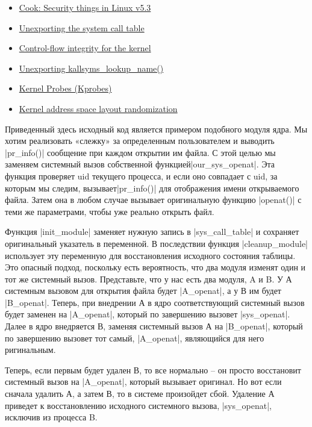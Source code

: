 \documentclass[10pt, oneside]{book}
\begin{document}
\begin{itemize}
 \item \href{https://lwn.net/Articles/804849/}{Cook: Security things in Linux v5.3}
 \item \href{https://lwn.net/Articles/12211/}{Unexporting the system call table}
 \item \href{https://lwn.net/Articles/810077/}{Control-flow integrity for the kernel}
 \item \href{https://lwn.net/Articles/813350/}{Unexporting kallsyms\_lookup\_name()}
 \item \href{https://www.kernel.org/doc/Documentation/kprobes.txt}{Kernel Probes (Kprobes)}
 \item \href{https://lwn.net/Articles/569635/}{Kernel address space layout randomization}
\end{itemize}

Приведенный здесь исходный код является примером подобного модуля ядра. Мы хотим
реализовать «слежку» за определенным пользователем и выводить \cpp|pr_info()| сообщение при каждом открытии им файла.
С этой целью мы заменяем системный вызов собственной функцией\cpp|our_sys_openat|.
 Эта функция проверяет uid текущего процесса, и если оно совпадает с uid, за которым мы следим, вызывает\cpp|pr_info()| для
отображения имени открываемого файла. Затем она в любом случае вызывает оригинальную функцию \cpp|openat()| с теми же параметрами, чтобы уже реально открыть файл.

Функция \cpp|init_module| заменяет нужную запись в \cpp|sys_call_table| и сохраняет оригинальный указатель в переменной.
В последствии функция \cpp|cleanup_module| использует эту переменную для восстановления исходного состояния таблицы. Это опасный подход, поскольку есть
вероятность, что два модуля изменят один и тот же системный вызов.
Представьте, что у нас есть два модуля, A и B. У А системным вызовом для открытия файла будет \cpp|A_openat|, а у В им будет \cpp|B_openat|.
Теперь, при внедрении А в ядро соответствующий системный вызов будет заменен на \cpp|A_openat|, который по завершению вызовет \cpp|sys_openat|. Далее в ядро внедряется В, заменяя системный вызов А на \cpp|B_openat|, который по завершению вызовет тот самый, \cpp|A_openat|, являющийся для него ригинальным.

Теперь, если первым будет удален В, то все нормально – он просто восстановит системный вызов на \cpp|A_openat|, который вызывает оригинал. Но вот если сначала удалить А, а затем В, то в системе произойдет сбой. Удаление А приведет к восстановлению исходного системного вызова, \cpp|sys_openat|, исключив из процесса B.
\end{document}
